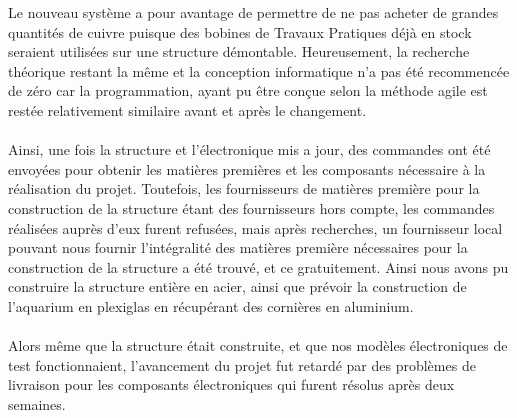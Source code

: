 \documentclass{article}
\begin{document}
        \noindent Le nouveau système a pour avantage de permettre de ne pas acheter de grandes quantités de cuivre puisque des bobines de Travaux Pratiques déjà en stock seraient utilisées sur une structure démontable. Heureusement, la recherche théorique restant la même et la conception informatique n'a pas été recommencée de zéro car la programmation, ayant pu être conçue selon la méthode agile est restée relativement similaire avant et après le changement.
        \\\\
        Ainsi, une fois la structure et l'électronique mis a jour, des commandes ont été envoyées pour obtenir les matières premières et les composants nécessaire à la réalisation du projet. Toutefois, les fournisseurs de matières première pour la construction de la structure étant des fournisseurs hors compte, les commandes réalisées auprès d'eux furent refusées, mais après recherches, un fournisseur local pouvant nous fournir l'intégralité des matières première nécessaires pour la construction de la structure a été trouvé, et ce gratuitement. Ainsi nous avons pu construire la structure entière en acier, ainsi que prévoir la construction de l'aquarium en plexiglas en récupérant des cornières en aluminium.
        \\\\
        Alors même que la structure était construite, et que nos modèles électroniques de test fonctionnaient, l'avancement du projet fut retardé par des problèmes de livraison pour les composants électroniques qui furent résolus après deux semaines.
\end{document}
